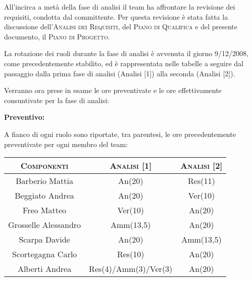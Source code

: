 \documentclass[11pt,a4paper]{article}
\begin{document}
All'incirca a metà della fase di analisi il team ha affrontare la revisione dei requisiti, condotta dal committente.
Per questa revisione è stata fatta la discussione dell'\textsc{Analisi dei Requisiti}, del \textsc{Piano di Qualifica} e del presente documento, il \textsc{Piano di Progetto}.

La rotazione dei ruoli durante la fase di analisi è avvenuta il giorno 9/12/2008, come precedentemente stabilito, ed è rappresentata nelle tabelle a seguire dal passaggio dalla prima fase di analisi (Analisi [1]) alla seconda (Analisi [2]).

Verranno ora prese in esame le ore preventivate e le ore effettivamente consuntivate per la fase di analisi:

\bigskip \bigskip 
\begin{large}\textbf{Preventivo:}\end{large}
\newline
A fianco di ogni ruolo sono riportate, tra parentesi, le ore precedentemente preventivate per ogni membro del team:
\\
\begin{center}
\begin{tabular}{|c||c|c|}
\hline
\textsc{Componenti} & \textsc{Analisi [1]} & \textsc{Analisi [2]} \\ \hline \hline
Barberio Mattia & An(20) & Res(11) \\ \hline
Beggiato Andrea & An(20) & Ver(10) \\ \hline
Freo Matteo & Ver(10) & An(20) \\ \hline
Grosselle Alessandro & Amm(13,5) & An(20) \\ \hline
Scarpa Davide & An(20) & Amm(13,5) \\ \hline
Scortegagna Carlo & Res(10) & An(20) \\ \hline
Alberti Andrea & Res(4)/Amm(3)/Ver(3) & An(20) \\ \hline
\end{tabular}
\end{center}
\end{document}
